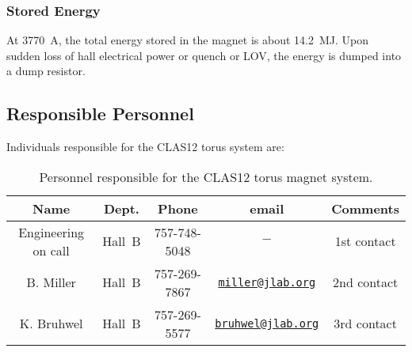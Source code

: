 \subsubsection{Stored Energy}

At 3770~A, the total energy stored in the magnet is about 14.2~MJ. Upon sudden loss of hall 
electrical power or quench or LOV, the energy is dumped into a dump resistor.

\subsection{Responsible Personnel}

Individuals responsible for the CLAS12 torus system are:

\begin{table}[!htb]
\centering
\begin{tabular}{|c|c|c|c|c|} \hline
Name       & Dept.  & Phone&email&Comments \\ \hline
Engineering on call & Hall~B &757-748-5048&$-$& 1st contact \\ \hline
B. Miller  & Hall~B & 757-269-7867&\href{mailto:miller@jlab.org}{\nolinkurl{miller@jlab.org}}&2nd contact\\ \hline
K. Bruhwel & Hall~B & 757-269-5577&\href{mailto:}{\nolinkurl{bruhwel@jlab.org}}&3rd contact \\ \hline
\end{tabular}
\caption{Personnel responsible for the CLAS12 torus magnet system.} 
\label{tb:torus}
\end{table}

